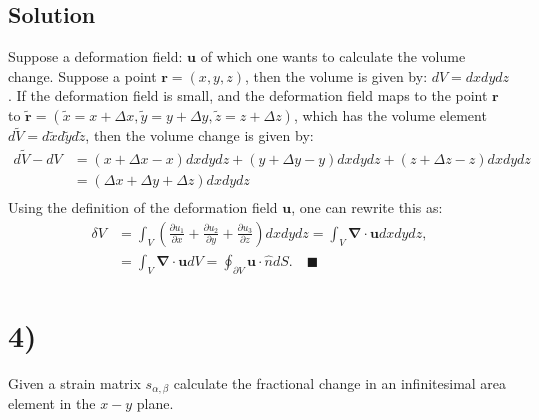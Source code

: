 \documentclass{article}
\newcommand{\dive}[1]{\mathbf{\nabla}\cdot \mathbf{#1}}
\begin{document}
\subsection*{Solution}
Suppose a deformation field: $\mathbf{u}$ of which one wants to calculate the volume change. Suppose a point $\mathbf{r} = (x,y,z)$, then the volume is given by: $dV = dxdydz$.
If the deformation field is small, and the deformation field maps to the point $\mathbf{r}$ to $\tilde{\mathbf{r}} = (\tilde{x} = x + \Delta x, \tilde{y} = y + \Delta y, \tilde{z} = z + \Delta z)$, which has the volume element $d\tilde{V} = d\tilde{x}d\tilde{y}d\tilde{z}$, then the volume change is given by:
\begin{align*}
    d\tilde{V} - dV &= \left(x + \Delta x - x\right)dxdydz + \left(y + \Delta y - y\right)dxdydz + \left(z + \Delta z - z\right)dxdydz\\
    &= \left(\Delta x + \Delta y  + \Delta z\right)dxdydz\\
\end{align*}Using the definition of the deformation field $\mathbf{u}$, one can rewrite this as:
\begin{align*}
    \delta V &= \int_V \left(\frac{\partial u_1}{\partial x} + \frac{\partial u_2}{\partial y} + \frac{\partial u_3}{\partial z}\right)dxdydz = \int_V \dive{\mathbf{u}}dxdydz,\\
    &=\int_V\dive{\mathbf{u}}dV = \oint_{\partial V}\mathbf{u}\cdot\hat{n}dS.\quad \blacksquare
\end{align*}


\begin{comment}
Suppose a deformation field $\mathbf{u}$, then the volume change is given by:
\begin{align*}
    \delta V = \int_V \dive{\mathbf{u}}dV.
\end{align*}Using the divergence theorem we can rewrite this as:
\begin{align*}
    \delta V = \oint_{\partial V} \mathbf{u}\cdot\hat{n}dS.
\end{align*}
\end{comment}
\section*{4)}
Given a strain matrix $s_{\alpha, \beta}$ calculate the fractional change in an
infinitesimal area element in the $x-y$ plane.
\end{document}
